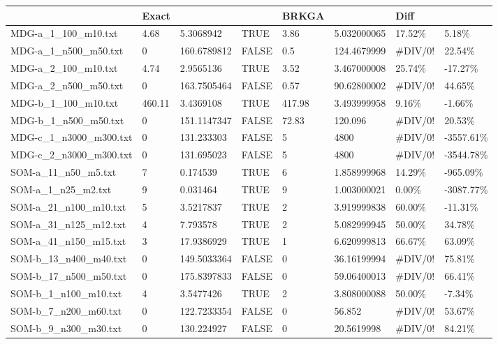 \documentclass[preprint,12pt]{elsarticle}
\begin{document}
\begin{landscape}
\begin{table}[!ht]
    \centering
    \begin{tabular}{|l|l|l|l|l|l|l|l|}
    \hline
    ~ & Exact & ~ & ~ & BRKGA & ~ & Diff & ~ \\ \hline
        MDG-a\_1\_100\_m10.txt & 4.68 & 5.3068942 & TRUE & 3.86 & 5.032000065 & 17.52\% & 5.18\% \\ \hline
        MDG-a\_1\_n500\_m50.txt & 0 & 160.6789812 & FALSE & 0.5 & 124.4679999 & \#DIV/0! & 22.54\% \\ \hline
        MDG-a\_2\_100\_m10.txt & 4.74 & 2.9565136 & TRUE & 3.52 & 3.467000008 & 25.74\% & -17.27\% \\ \hline
        MDG-a\_2\_n500\_m50.txt & 0 & 163.7505464 & FALSE & 0.57 & 90.62800002 & \#DIV/0! & 44.65\% \\ \hline
        MDG-b\_1\_100\_m10.txt & 460.11 & 3.4369108 & TRUE & 417.98 & 3.493999958 & 9.16\% & -1.66\% \\ \hline
        MDG-b\_1\_n500\_m50.txt & 0 & 151.1147347 & FALSE & 72.83 & 120.096 & \#DIV/0! & 20.53\% \\ \hline
        MDG-c\_1\_n3000\_m300.txt & 0 & 131.233303 & FALSE & 5 & 4800 & \#DIV/0! & -3557.61\% \\ \hline
        MDG-c\_2\_n3000\_m300.txt & 0 & 131.695023 & FALSE & 5 & 4800 & \#DIV/0! & -3544.78\% \\ \hline
        SOM-a\_11\_n50\_m5.txt & 7 & 0.174539 & TRUE & 6 & 1.858999968 & 14.29\% & -965.09\% \\ \hline
        SOM-a\_1\_n25\_m2.txt & 9 & 0.031464 & TRUE & 9 & 1.003000021 & 0.00\% & -3087.77\% \\ \hline
        SOM-a\_21\_n100\_m10.txt & 5 & 3.5217837 & TRUE & 2 & 3.919999838 & 60.00\% & -11.31\% \\ \hline
        SOM-a\_31\_n125\_m12.txt & 4 & 7.793578 & TRUE & 2 & 5.082999945 & 50.00\% & 34.78\% \\ \hline
        SOM-a\_41\_n150\_m15.txt & 3 & 17.9386929 & TRUE & 1 & 6.620999813 & 66.67\% & 63.09\% \\ \hline
        SOM-b\_13\_n400\_m40.txt & 0 & 149.5033364 & FALSE & 0 & 36.16199994 & \#DIV/0! & 75.81\% \\ \hline
        SOM-b\_17\_n500\_m50.txt & 0 & 175.8397833 & FALSE & 0 & 59.06400013 & \#DIV/0! & 66.41\% \\ \hline
        SOM-b\_1\_n100\_m10.txt & 4 & 3.5477426 & TRUE & 2 & 3.808000088 & 50.00\% & -7.34\% \\ \hline
        SOM-b\_7\_n200\_m60.txt & 0 & 122.7233354 & FALSE & 0 & 56.852 & \#DIV/0! & 53.67\% \\ \hline
        SOM-b\_9\_n300\_m30.txt & 0 & 130.224927 & FALSE & 0 & 20.5619998 & \#DIV/0! & 84.21\% \\ \hline
    \end{tabular}
\end{table}
\end{landscape}
\end{document}

